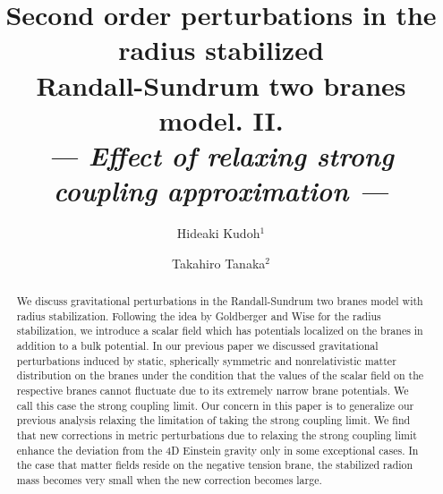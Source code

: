 \documentclass[a4paper,showpacs,preprintnumbers,amsmath,amssymb]{revtex4}
\begin{document}
\title{Second order perturbations in the radius stabilized\\
Randall-Sundrum two branes model. II. \\
\it --- Effect of relaxing strong coupling approximation ---}


\author{Hideaki Kudoh${^{1}}$ }
\author{Takahiro Tanaka${^{2}}$} 



\begin{abstract}
We discuss  gravitational perturbations in the Randall-Sundrum two 
branes model with radius stabilization. 
Following the idea by Goldberger and Wise for the radius stabilization, 
we introduce a scalar field which has potentials localized on 
the branes in addition to a bulk potential. 
In our previous paper we discussed gravitational perturbations 
induced by static, spherically symmetric and nonrelativistic matter 
distribution on the branes under the condition 
that the values of the scalar field 
on the respective branes cannot fluctuate due to 
its extremely narrow brane potentials.  
We call this case the strong coupling limit.   
Our concern in this paper is to generalize our previous analysis 
relaxing the limitation of taking the strong coupling limit.  
We find that new corrections in metric perturbations 
due to relaxing the strong coupling limit enhance the deviation from the 
4D Einstein gravity only in some exceptional cases.  
In the case that matter fields reside on the negative 
tension brane, the stabilized radion mass becomes very small when 
the new correction becomes large. 
\end{abstract}

 

\maketitle

\newcommand{\stac}[2]{ \stackrel{\scriptscriptstyle {#1}}{#2}   }
\end{document}
